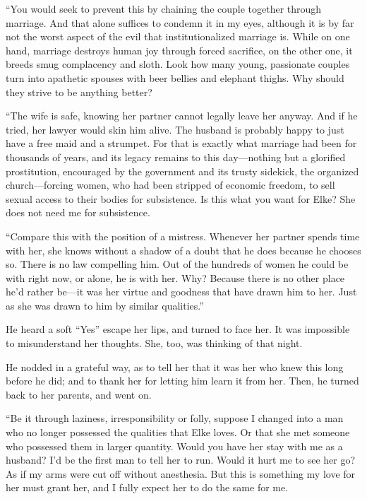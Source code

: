 ``You would seek to prevent this by chaining the couple together through marriage. And that alone suffices to condemn it in my eyes, although it is by far not the worst aspect of the evil that institutionalized marriage is. While on one hand, marriage destroys human joy through forced sacrifice, on the other one, it breeds smug complacency and sloth. Look how many young, passionate couples turn into apathetic spouses with beer bellies and elephant thighs. Why should they strive to be anything better?

``The wife is safe, knowing her partner cannot legally leave her anyway. And if he tried, her lawyer would skin him alive. The husband is probably happy to just have a free maid and a strumpet. For that is exactly what marriage had been for thousands of years, and its legacy remains to this day---nothing but a glorified prostitution, encouraged by the government and its trusty sidekick, the organized church---forcing women, who had been stripped of economic freedom, to sell sexual access to their bodies for subsistence. Is this what you want for Elke? She does not need me for subsistence.

``Compare this with the position of a mistress. Whenever her partner spends time with her, she knows without a shadow of a doubt that he does because he chooses so. There is no law compelling him. Out of the hundreds of women he could be with right now, or alone, he is with her. Why? Because there is no other place he'd rather be---it was her virtue and goodness that have drawn him to her. Just as she was drawn to him by similar qualities.''

He heard a soft ``Yes'' escape her lips, and turned to face her. It was impossible to misunderstand her thoughts. She, too, was thinking of that night.

He nodded in a grateful way, as to tell her that it was her who knew this long before he did; and to thank her for letting him learn it from her. Then, he turned back to her parents, and went on.

``Be it through laziness, irresponsibility or folly, suppose I changed into a man who no longer possessed the qualities that Elke loves. Or that she met someone who possessed them in larger quantity. Would you have her stay with me as a husband? I'd be the first man to tell her to run. Would it hurt me to see her go? As if my arms were cut off without anesthesia. But this is something my love for her must grant her, and I fully expect her to do the same for me.

